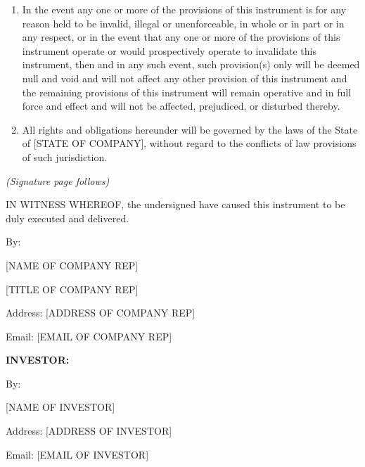 \documentclass[12pt,letterpaper,fullpage]{article}
\newcommand{\CompanyRepName}{[NAME OF COMPANY REP]}
\newcommand{\CompanyRepTitle}{[TITLE OF COMPANY REP]}
\newcommand{\CompanyRepAddress}{[ADDRESS OF COMPANY REP]}
\newcommand{\CompanyRepEmail}{[EMAIL OF COMPANY REP]}
\newcommand{\CompanyState}{[STATE OF COMPANY]}
\newcommand{\InvestorName}{[NAME OF INVESTOR]}
\newcommand{\InvestorEmail}{[EMAIL OF INVESTOR]}
\newcommand{\InvestorAddress}{[ADDRESS OF INVESTOR]}
\begin{document}
\begin{enumerate}[label=(\alph*)]
\item {In the event any one or more of the provisions of this
    instrument is for any reason held to be invalid, illegal or
    unenforceable, in whole or in part or in any respect, or in the
    event that any one or more of the provisions of this instrument
    operate or would prospectively operate to invalidate this
    instrument, then and in any such event, such provision(s) only
    will be deemed null and void and will not affect any other
    provision of this instrument and the remaining provisions of this
    instrument will remain operative and in full force and effect and
    will not be affected, prejudiced, or disturbed thereby.}

\item {All rights and obligations hereunder will be governed by the
    laws of the State of \CompanyState{}, without regard to the conflicts
    of law provisions of such jurisdiction.}

\end{enumerate}

\begin{center} \emph{(Signature page follows)} \end{center}

\newpage

IN WITNESS WHEREOF, the undersigned have caused this instrument to be duly executed and delivered.

\vspace{0.5in}

\hspace{2in}
By:

\vspace{1in}

\hspace{2.5in}
\CompanyRepName{}

\vspace{0.2in}

\hspace{2.5in}
\CompanyRepTitle{}

\vspace{0.2in}

\hspace{2.5in}
\parbox{2.5in}{
Address: \CompanyRepAddress{}
}

\vspace{0.2in}

\hspace{2.5in}
Email: \CompanyRepEmail{}

\vspace{0.5in}

\hspace{2in}
\textbf{INVESTOR:}

\vspace{0.2in}

\hspace{2in}
By:

\vspace{1in}

\hspace{2.5in}
\InvestorName{}

\vspace{0.2in}

\hspace{2.5in}
\parbox{3in}{
Address: \InvestorAddress{}
}

\vspace{0.2in}

\hspace{2.5in}
Email: \InvestorEmail{}
\end{document}
